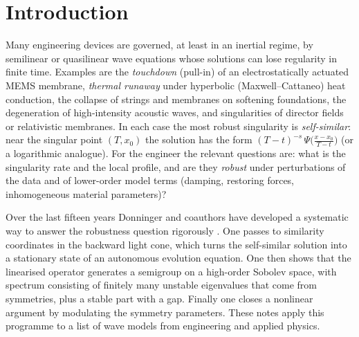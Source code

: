 \section{Introduction}
\label{intro:sec}

Many engineering devices are governed, at least in an inertial regime, by
semilinear or quasilinear wave equations whose solutions can lose regularity
in finite time. Examples are the \emph{touchdown} (pull-in) of an
electrostatically actuated MEMS membrane, \emph{thermal runaway} under
hyperbolic (Maxwell--Cattaneo) heat conduction, the collapse of strings and
membranes on softening foundations, the degeneration of high-intensity
acoustic waves, and singularities of director fields or relativistic
membranes. In each case the most robust singularity is \emph{self-similar}:
near the singular point $(T,x_0)$ the solution has the form
$(T-t)^{-s}\,\Psi\big(\frac{x-x_0}{T-t}\big)$ (or a logarithmic analogue). For the
engineer the relevant questions are: what is the singularity rate and the
local profile, and are they \emph{robust} under perturbations of the data
and of lower-order model terms (damping, restoring forces, inhomogeneous
material parameters)?

Over the last fifteen years Donninger and coauthors have developed a
systematic way to answer the robustness question rigorously
\cite{Donninger2011,DonningerSchoerkhuber2012,DonningerSchoerkhuber2014,DonningerSchoerkhuber2016,DonningerSchoerkhuber2017,CostinDonningerGlogic2017,Ostermann2024,Glogic2025,Donninger2024}.
One passes to similarity coordinates in the backward light cone, which turns
the self-similar solution into a stationary state of an autonomous
evolution equation. One then shows that the linearised operator generates a
semigroup on a high-order Sobolev space, with spectrum consisting of
finitely many unstable eigenvalues that come from symmetries, plus a stable
part with a gap. Finally one closes a nonlinear argument by modulating the
symmetry parameters. These notes apply this programme to a list of wave
models from engineering and applied physics.

